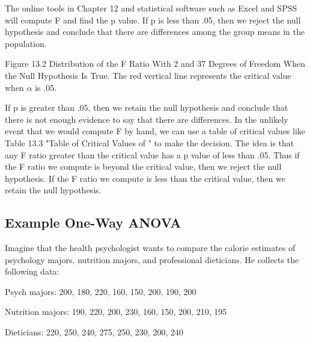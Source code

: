 The online tools in Chapter 12 and statistical software such as Excel and SPSS will compute F and find the p value. If p is less than .05, then we reject the null hypothesis and conclude that there are differences among the group
means in the population. 

Figure 13.2 Distribution of the F Ratio With 2 and 37 Degrees of Freedom When the Null Hypothesis Is True. The red vertical line represents the critical value when $\alpha$ is .05.


If p is greater than .05, then we retain the null hypothesis and conclude that there is not enough evidence to say that there are differences. In the unlikely event that we would compute F by hand, we can use a table of critical values like Table 13.3 "Table of Critical Values of " to make the decision. The idea is that any F ratio greater than the critical value has a p value of less than .05. Thus if the F ratio we compute is beyond the critical value, then we reject the null hypothesis. If the F ratio we compute is less than the critical value, then we retain the null hypothesis.

                            
\subsection{Example One-Way ANOVA}

Imagine that the health psychologist wants to compare the calorie estimates of psychology majors, nutrition majors, and professional dieticians. He collects the following data:


\begin{kframe}
Psych majors: 200, 180, 220, 160, 150, 200, 190, 200

\end{kframe}

\begin{kframe}
Nutrition majors: 190, 220, 200, 230, 160, 150, 200, 210, 195

\end{kframe}

\begin{kframe}
Dieticians: 220, 250, 240, 275, 250, 230, 200, 240

\end{kframe}

